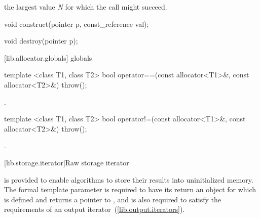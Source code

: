 \begin{itemdescr}
\pnum
\returns
the largest value \textit{N} for which the call 
might succeed.
\end{itemdescr}

%
\begin{itemdecl}
void construct(pointer p, const_reference val);
\end{itemdecl}

\begin{itemdescr}
\pnum
\returns
{}
\end{itemdescr}

%
\begin{itemdecl}
void destroy(pointer p);
\end{itemdecl}

\begin{itemdescr}
\pnum
\returns
{}
\end{itemdescr}

[lib.allocator.globals]{ globals}

%
%
\begin{itemdecl}
template <class T1, class T2>
  bool operator==(const allocator<T1>&, const allocator<T2>&) throw();
\end{itemdecl}

\begin{itemdescr}
\pnum
\returns
{}.
\end{itemdescr}

%
%
\begin{itemdecl}
template <class T1, class T2>
  bool operator!=(const allocator<T1>&, const allocator<T2>&) throw();
\end{itemdecl}

\begin{itemdescr}
\pnum
\returns
{}.
\end{itemdescr}

[lib.storage.iterator]{Raw storage iterator}

\pnum
{} is provided to enable algorithms to store their
results into uninitialized memory. The formal template parameter
 is required to have its  return an
object for which  is defined and returns a pointer to
, and is also required to satisfy the requirements of an output
iterator~(\ref{lib.output.iterators}).

